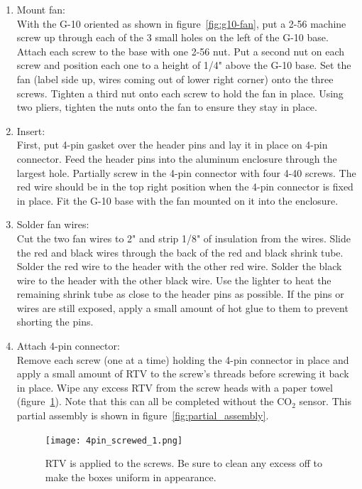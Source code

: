 \documentclass[letterpaper,12pt]{article}
\begin{document}
	\begin{enumerate}
		\item Mount fan: \\
		\textnormal{With the G-10 oriented as shown in figure~\ref{fig:g10-fan}, put a 2-56 machine screw up through each of the 3 small holes on the left of the G-10 base. Attach each screw to the base with one 2-56 nut. Put a second nut on each screw and position each one to a height of 1/4" above the G-10 base. Set the fan (label side up, wires coming out of lower right corner) onto the three screws. Tighten a third nut onto each screw to hold the fan in place. Using two pliers, tighten the nuts onto the fan to ensure they stay in place.}
		\item Insert: \\
		\textnormal{First, put 4-pin gasket over the header pins and lay it in place on 4-pin connector. Feed the header pins into the aluminum enclosure through the largest hole. Partially screw in the 4-pin connector with four 4-40 screws. The red wire should be in the top right position when the 4-pin connector is fixed in place. Fit the G-10 base with the fan mounted on it into the enclosure.}
		\item Solder fan wires: \\
		\textnormal{Cut the two fan wires to 2" and strip 1/8" of insulation from the wires. Slide the red and black wires through the back of the red and black shrink tube. Solder the red wire to the header with the other red wire. Solder the black wire to the header with the other black wire. Use the lighter to heat the remaining shrink tube as close to the header pins as possible. If the pins or wires are still exposed, apply a small amount of hot glue to them to prevent shorting the pins.}
		\item Attach 4-pin connector: \\
		\textnormal{Remove each screw (one at a time) holding the 4-pin connector in place and apply a small amount of RTV to the screw's threads before screwing it back in place. Wipe any excess RTV from the screw heads with a paper towel (figure~\ref{fig:screwed}). Note that this can all be completed without the CO$_2$ sensor. This partial assembly is shown in figure~\ref{fig:partial_assembly}.}
		\begin{figure} [h]
			\centering
			\texttt{[image: 4pin\_screwed\_1.png]}
			\caption{RTV is applied to the screws. Be sure to clean any excess off to make the boxes uniform in appearance.}
			\label{fig:screwed}
		\end{figure}

\end{enumerate}
\end{document}
